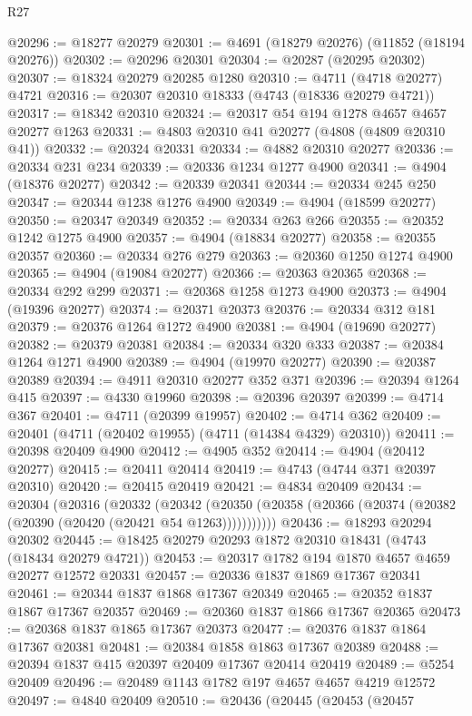 \begin{lexlean}{R27}
\begin{coremodule}
@20296 := @18277 @20279
@20301 := @4691 (@18279 @20276) (@11852 (@18194 @20276))
@20302 := @20296 @20301
@20304 := @20287 (@20295 @20302)
@20307 := @18324 @20279 @20285 @1280
@20310 := @4711 (@4718 @20277) @4721
@20316 := @20307 @20310 @18333 (@4743 (@18336 @20279 @4721))
@20317 := @18342 @20310
@20324 := @20317 @54 @194 @1278 @4657 @4657 @20277 @1263
@20331 := @4803 @20310 @41 @20277 (@4808 (@4809 @20310 @41))
@20332 := @20324 @20331
@20334 := @4882 @20310 @20277
@20336 := @20334 @231 @234
@20339 := @20336 @1234 @1277 @4900
@20341 := @4904 (@18376 @20277)
@20342 := @20339 @20341
@20344 := @20334 @245 @250
@20347 := @20344 @1238 @1276 @4900
@20349 := @4904 (@18599 @20277)
@20350 := @20347 @20349
@20352 := @20334 @263 @266
@20355 := @20352 @1242 @1275 @4900
@20357 := @4904 (@18834 @20277)
@20358 := @20355 @20357
@20360 := @20334 @276 @279
@20363 := @20360 @1250 @1274 @4900
@20365 := @4904 (@19084 @20277)
@20366 := @20363 @20365
@20368 := @20334 @292 @299
@20371 := @20368 @1258 @1273 @4900
@20373 := @4904 (@19396 @20277)
@20374 := @20371 @20373
@20376 := @20334 @312 @181
@20379 := @20376 @1264 @1272 @4900
@20381 := @4904 (@19690 @20277)
@20382 := @20379 @20381
@20384 := @20334 @320 @333
@20387 := @20384 @1264 @1271 @4900
@20389 := @4904 (@19970 @20277)
@20390 := @20387 @20389
@20394 := @4911 @20310 @20277 @352 @371
@20396 := @20394 @1264 @415
@20397 := @4330 @19960
@20398 := @20396 @20397
@20399 := @4714 @367
@20401 := @4711 (@20399 @19957)
@20402 := @4714 @362
@20409 := @20401 (@4711 (@20402 @19955) (@4711 (@14384 @4329) @20310))
@20411 := @20398 @20409 @4900
@20412 := @4905 @352
@20414 := @4904 (@20412 @20277)
@20415 := @20411 @20414
@20419 := @4743 (@4744 @371 @20397 @20310)
@20420 := @20415 @20419
@20421 := @4834 @20409
@20434 := @20304
    (@20316
      (@20332
        (@20342 (@20350 (@20358 (@20366 (@20374 (@20382 (@20390 (@20420 (@20421 @54 @1263)))))))))))
@20436 := @18293 @20294 @20302
@20445 := @18425 @20279 @20293 @1872 @20310 @18431 (@4743 (@18434 @20279 @4721))
@20453 := @20317 @1782 @194 @1870 @4657 @4659 @20277 @12572 @20331
@20457 := @20336 @1837 @1869 @17367 @20341
@20461 := @20344 @1837 @1868 @17367 @20349
@20465 := @20352 @1837 @1867 @17367 @20357
@20469 := @20360 @1837 @1866 @17367 @20365
@20473 := @20368 @1837 @1865 @17367 @20373
@20477 := @20376 @1837 @1864 @17367 @20381
@20481 := @20384 @1858 @1863 @17367 @20389
@20488 := @20394 @1837 @415 @20397 @20409 @17367 @20414 @20419
@20489 := @5254 @20409
@20496 := @20489 @1143 @1782 @197 @4657 @4657 @4219 @12572
@20497 := @4840 @20409
@20510 := @20436
    (@20445
      (@20453
        (@20457

\end{coremodule}
\end{lexlean}
